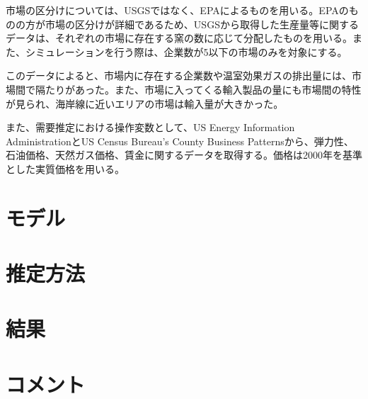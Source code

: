 \documentclass[11pt]{jsarticle}
\begin{document}
市場の区分けについては、USGSではなく、EPAによるものを用いる。EPAのものの方が市場の区分けが詳細であるため、USGSから取得した生産量等に関するデータは、それぞれの市場に存在する窯の数に応じて分配したものを用いる。また、シミュレーションを行う際は、企業数が5以下の市場のみを対象にする。

このデータによると、市場内に存在する企業数や温室効果ガスの排出量には、市場間で隔たりがあった。また、市場に入ってくる輸入製品の量にも市場間の特性が見られ、海岸線に近いエリアの市場は輸入量が大きかった。

また、需要推定における操作変数として、US Energy Information AdministrationとUS Census Bureau's County Business Patternsから、弾力性、石油価格、天然ガス価格、賃金に関するデータを取得する。価格は2000年を基準とした実質価格を用いる。

\section{モデル}

\section{推定方法}

\section{結果}



\section{コメント}
\end{document}

